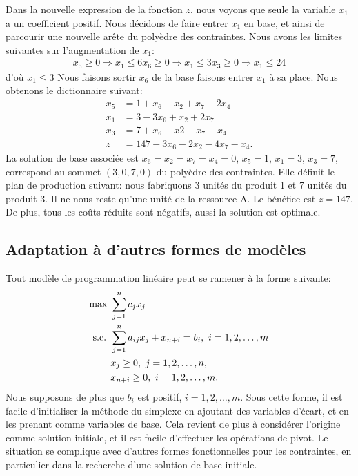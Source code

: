 \begin{example}[Production]
Dans la nouvelle expression de la fonction $z$, nous voyons que seule la variable $x_1$ a un coefficient positif.
Nous décidons de faire entrer $x_1$ en base, et ainsi de parcourir une nouvelle arête du polyèdre des contraintes.
Nous avons les limites suivantes sur l'augmentation de $x_1$:
\begin{align*}
x_5 \geq 0 \Rightarrow x_1 \leq 6
x_6 \geq 0 \Rightarrow x_1 \leq 3
x_3 \geq 0 \Rightarrow x_1 \leq 24
\end{align*}
d'où $x_1 \leq 3$
Nous faisons sortir $x_6$ de la base faisons entrer $x_1$ à sa place.
Nous obtenons le dictionnaire suivant:
\begin{align*}
x_5 &= 1 + x_6 - x_2 + x_7 - 2x_4 \\
x_1 &= 3 - 3x_6 + x_2 + 2x_7 \\
x_3 &= 7 + x_6 - x2 - x_7 - x_4 \\
z &= 147 - 3x_6 - 2x_2 - 4x_7 - x_4.
\end{align*}
La solution de base associée est $x_6 = x_2 = x_7 = x_4 = 0$, $x_5 = 1$, $x_1 = 3$, $x_3 = 7$, correspond au sommet $(3, 0, 7, 0)$ du polyèdre des contraintes.
Elle définit le plan de production suivant: nous fabriquons 3 unités du produit 1 et 7 unités du produit 3.
Il ne nous reste qu'une unité de la ressource A.
Le bénéfice est $z = 147$.
De plus, tous les coûts réduits sont négatifs, aussi la solution est optimale.
\end{example}

\subsection{Adaptation à d'autres formes de modèles}

Tout modèle de programmation linéaire peut se ramener à la forme suivante:
\begin{align*}
\max \ & \sum_{j = 1}^n c_j x_j \\
\mbox{s.c. } & \sum_{j = 1}^n a_{ij} x_j + x_{n+i} = b_i,\ i = 1,2,\ldots,m\\
& x_j \geq 0,\ j = 1,2,\ldots,n, \\
& x_{n+i} \geq 0,\ i = 1,2,\ldots,m.
\end{align*}
Nous supposons de plus que $b_i$ est positif, $i = 1,2,\ldots,m$.
Sous cette forme, il est facile d'initialiser la méthode du simplexe en ajoutant des variables d'écart, et en les prenant comme variables de base.
Cela revient de plus à considérer l'origine comme solution initiale, et il est facile d'effectuer les opérations de pivot.
Le situation se complique avec d'autres formes fonctionnelles pour les contraintes, en particulier dans la recherche d'une solution de base initiale.

